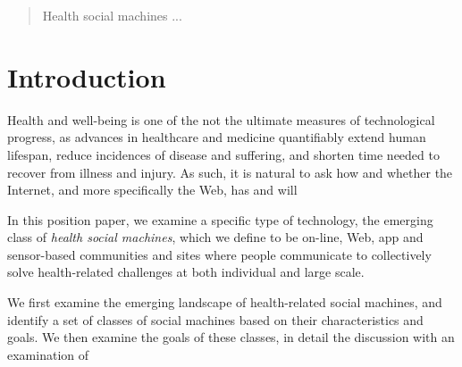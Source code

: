 \documentclass{sig-alternate}
\begin{document}
\maketitle
\begin{abstract}

Health social machines ...

\end{abstract}




\section{Introduction}

Health and well-being is one of the not the ultimate measures of
technological progress, as advances in healthcare and medicine
quantifiably extend human lifespan, reduce incidences of disease and
suffering, and shorten time needed to recover from illness and injury.
As such, it is natural to ask how and whether the Internet, and more
specifically the Web, has and will 

In this position paper, we examine a specific type of technology, the
emerging class of \emph{health social machines}, which we define to be
on-line, Web, app and sensor-based communities and sites where people
communicate to collectively solve health-related challenges at both
individual and large scale.  

We first examine the emerging landscape of health-related social
machines, and identify a set of classes of social machines based on
their characteristics and goals.  We then examine the goals of these
classes, in detail the discussion with an examination of




\end{document}
